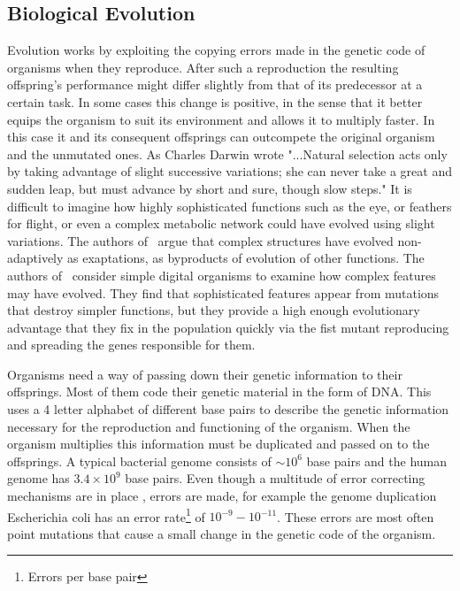\documentclass[a4paper,12pt]{article}
\begin{document}
	
	\subsection{Biological Evolution}\label{chap:evolution}
	
	Evolution works by exploiting the copying errors made in the genetic code of organisms when they reproduce. After such a reproduction the resulting offspring's performance might differ slightly from that of its predecessor at a certain task. In some cases this change is positive, in the sense that it better equips the organism to suit its environment and allows it to multiply faster. In this case it and its consequent offsprings can outcompete the original organism and the unmutated ones. As Charles Darwin wrote "...Natural selection acts only by taking advantage of slight successive variations; she can never take a great and sudden leap, but must advance by short and sure, though slow steps." \cite{darwin} 
	It is difficult to imagine how highly sophisticated functions such as the eye, or feathers for flight, or even a complex metabolic network could have evolved using slight variations. The authors of~\cite{latent} argue that complex structures have evolved non-adaptively as exaptations, as byproducts of evolution of other functions. The authors of~\cite{complexfeatures} consider simple digital organisms to examine how complex features may have evolved. They find that sophisticated features appear from mutations that destroy simpler functions, but they provide a high enough evolutionary advantage that they fix in the population quickly via the fist mutant reproducing and spreading the genes responsible for them. 
	

	Organisms need a way of passing down their genetic information to their offsprings. 
	Most of them code their genetic material in the form of DNA. This uses a 4 letter alphabet of different base pairs to describe the genetic information necessary for the reproduction and functioning of the organism. When the organism multiplies this information must be duplicated and passed on to the offsprings. A typical bacterial genome consists of $\sim 10^6$ base pairs and the human genome has $3.4 \times 10^9$ base pairs. Even though a multitude of error correcting mechanisms are in place \cite{dnarepair}, errors are made, for example the genome duplication Escherichia coli has an error rate\footnote{Errors per base pair} of $10^{-9} - 10^{-11}$\cite{ecolierrorrate}. These errors are most often point mutations that cause a small change in the genetic code of the organism.
	
\end{document}

